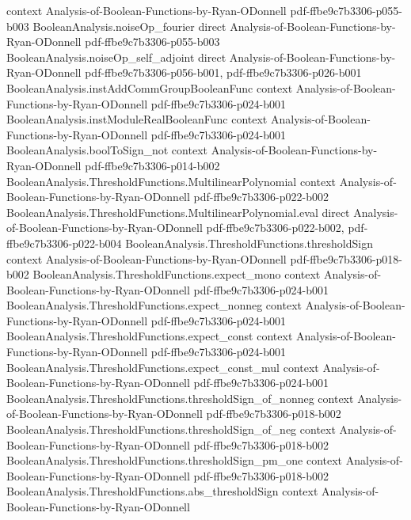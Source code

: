 \begin{theorem}
  {context}
  {Analysis-of-Boolean-Functions-by-Ryan-ODonnell}
  {pdf-ffbe9c7b3306-p055-b003}
\proofstep
  {BooleanAnalysis.noiseOp_fourier}
  {direct}
  {Analysis-of-Boolean-Functions-by-Ryan-ODonnell}
  {pdf-ffbe9c7b3306-p055-b003}
\proofstep
  {BooleanAnalysis.noiseOp_self_adjoint}
  {direct}
  {Analysis-of-Boolean-Functions-by-Ryan-ODonnell}
  {pdf-ffbe9c7b3306-p056-b001,
    pdf-ffbe9c7b3306-p026-b001}
\proofstep
  {BooleanAnalysis.instAddCommGroupBooleanFunc}
  {context}
  {Analysis-of-Boolean-Functions-by-Ryan-ODonnell}
  {pdf-ffbe9c7b3306-p024-b001}
\proofstep
  {BooleanAnalysis.instModuleRealBooleanFunc}
  {context}
  {Analysis-of-Boolean-Functions-by-Ryan-ODonnell}
  {pdf-ffbe9c7b3306-p024-b001}
\proofstep
  {BooleanAnalysis.boolToSign_not}
  {context}
  {Analysis-of-Boolean-Functions-by-Ryan-ODonnell}
  {pdf-ffbe9c7b3306-p014-b002}
\proofstep
  {BooleanAnalysis.ThresholdFunctions.MultilinearPolynomial}
  {context}
  {Analysis-of-Boolean-Functions-by-Ryan-ODonnell}
  {pdf-ffbe9c7b3306-p022-b002}
\proofstep
  {BooleanAnalysis.ThresholdFunctions.MultilinearPolynomial.eval}
  {direct}
  {Analysis-of-Boolean-Functions-by-Ryan-ODonnell}
  {pdf-ffbe9c7b3306-p022-b002,
    pdf-ffbe9c7b3306-p022-b004}
\proofstep
  {BooleanAnalysis.ThresholdFunctions.thresholdSign}
  {context}
  {Analysis-of-Boolean-Functions-by-Ryan-ODonnell}
  {pdf-ffbe9c7b3306-p018-b002}
\proofstep
  {BooleanAnalysis.ThresholdFunctions.expect_mono}
  {context}
  {Analysis-of-Boolean-Functions-by-Ryan-ODonnell}
  {pdf-ffbe9c7b3306-p024-b001}
\proofstep
  {BooleanAnalysis.ThresholdFunctions.expect_nonneg}
  {context}
  {Analysis-of-Boolean-Functions-by-Ryan-ODonnell}
  {pdf-ffbe9c7b3306-p024-b001}
\proofstep
  {BooleanAnalysis.ThresholdFunctions.expect_const}
  {context}
  {Analysis-of-Boolean-Functions-by-Ryan-ODonnell}
  {pdf-ffbe9c7b3306-p024-b001}
\proofstep
  {BooleanAnalysis.ThresholdFunctions.expect_const_mul}
  {context}
  {Analysis-of-Boolean-Functions-by-Ryan-ODonnell}
  {pdf-ffbe9c7b3306-p024-b001}
\proofstep
  {BooleanAnalysis.ThresholdFunctions.thresholdSign_of_nonneg}
  {context}
  {Analysis-of-Boolean-Functions-by-Ryan-ODonnell}
  {pdf-ffbe9c7b3306-p018-b002}
\proofstep
  {BooleanAnalysis.ThresholdFunctions.thresholdSign_of_neg}
  {context}
  {Analysis-of-Boolean-Functions-by-Ryan-ODonnell}
  {pdf-ffbe9c7b3306-p018-b002}
\proofstep
  {BooleanAnalysis.ThresholdFunctions.thresholdSign_pm_one}
  {context}
  {Analysis-of-Boolean-Functions-by-Ryan-ODonnell}
  {pdf-ffbe9c7b3306-p018-b002}
\proofstep
  {BooleanAnalysis.ThresholdFunctions.abs_thresholdSign}
  {context}
  {Analysis-of-Boolean-Functions-by-Ryan-ODonnell}

\end{theorem}
